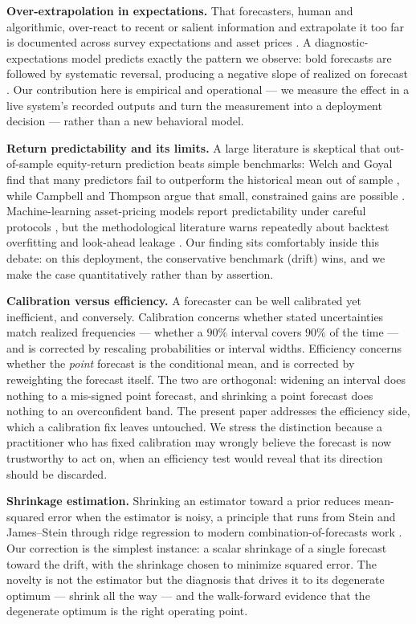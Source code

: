 \documentclass[10pt,twocolumn,twoside]{eec_style}
\begin{document}
\textbf{Over-extrapolation in expectations.} That forecasters, human and algorithmic,
over-react to recent or salient information and extrapolate it too far is documented
across survey expectations and asset prices \cite{bordalo2019,greenwood2014}.
A diagnostic-expectations model predicts exactly the pattern we observe: bold forecasts
are followed by systematic reversal, producing a negative slope of realized on forecast
\cite{bordalo2018}. Our contribution here is empirical and operational --- we measure the
effect in a live system's recorded outputs and turn the measurement into a deployment
decision --- rather than a new behavioral model.

\textbf{Return predictability and its limits.} A large literature is skeptical that
out-of-sample equity-return prediction beats simple benchmarks: Welch and Goyal find
that many predictors fail to outperform the historical mean out of sample
\cite{welch2008}, while Campbell and Thompson argue that small, constrained gains are
possible \cite{campbell2008}. Machine-learning asset-pricing models report
predictability under careful protocols \cite{gu2020}, but the methodological literature
warns repeatedly about backtest overfitting and look-ahead leakage
\cite{bailey2014,lopez2018}. Our finding sits comfortably inside this debate: on this
deployment, the conservative benchmark (drift) wins, and we make the case
quantitatively rather than by assertion.

\textbf{Calibration versus efficiency.} A forecaster can be well calibrated yet
inefficient, and conversely. Calibration concerns whether stated uncertainties match
realized frequencies --- whether a $90\%$ interval covers $90\%$ of the time --- and is
corrected by rescaling probabilities or interval widths. Efficiency concerns whether the
\emph{point} forecast is the conditional mean, and is corrected by reweighting the
forecast itself. The two are orthogonal: widening an interval does nothing to a
mis-signed point forecast, and shrinking a point forecast does nothing to an
overconfident band. The present paper addresses the efficiency side, which a
calibration fix leaves untouched. We stress the distinction because a practitioner who
has fixed calibration may wrongly believe the forecast is now trustworthy to act on,
when an efficiency test would reveal that its direction should be discarded.

\textbf{Shrinkage estimation.} Shrinking an estimator toward a prior reduces
mean-squared error when the estimator is noisy, a principle that runs from Stein and
James--Stein \cite{stein1956,james1961} through ridge regression \cite{hoerl1970} to
modern combination-of-forecasts work \cite{timmermann2006}. Our correction is the simplest
instance: a scalar shrinkage of a single forecast toward the drift, with the
shrinkage chosen to minimize squared error. The novelty is not the estimator but the
diagnosis that drives it to its degenerate optimum --- shrink all the way --- and the
walk-forward evidence that the degenerate optimum is the right operating point.
\end{document}

